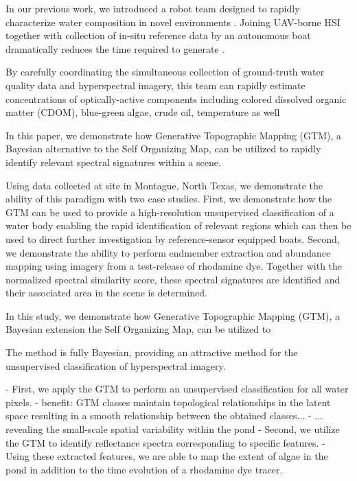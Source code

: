 \documentclass{article}
\begin{document}
In our previous work, we introduced a robot team designed to rapidly characterize water composition in novel environments \cite{robot-team-1}. 
Joining UAV-borne HSI together with collection of in-situ reference data by an autonomous boat dramatically reduces the time required to generate .

By carefully coordinating the simultaneous collection of ground-truth water quality data and hyperspectral imagery, this team can rapidly estimate concentrations of optically-active components including colored dissolved organic matter (CDOM), blue-green algae, crude oil, temperature as well 


In this paper, we demonstrate how Generative Topographic Mapping (GTM), a Bayesian alternative to the Self Organizing Map, can be utilized to rapidly identify relevant spectral signatures within a scene.

Using data collected at site in Montague, North Texas, we demonstrate the ability of this paradigm with two case studies. First, we demonstrate how the GTM can be used to provide a high-resolution unsupervised classification of a water body enabling the rapid identification of relevant regions which can then be used to direct further investigation by reference-sensor equipped boats. Second, we demonstrate the ability to perform endmember extraction and abundance mapping using imagery from a test-release of rhodamine dye. Together with the normalized spectral similarity score, these spectral signatures are identified and their associated area in the scene is determined.


In this study, we demonstrate how Generative Topographic Mapping (GTM), a Bayesian extension the Self Organizing Map, can be utilized to 

The method is fully Bayesian, providing an attractive method for the unsupervised classification of hyperspectral imagery. 

- First, we apply the GTM to perform an unsupervised classification for all water pixels. 
    - benefit: GTM classes maintain topological relationships in the latent space resulting in a smooth relationship between the obtained classes...
    - ... revealing the small-scale spatial variability within the pond
- Second, we utilize the GTM to identify reflectance spectra corresponding to specific features. 
- Using these extracted features, we are able to map the extent of algae in the pond in addition to the time evolution of a rhodamine dye tracer. 




\end{document}
